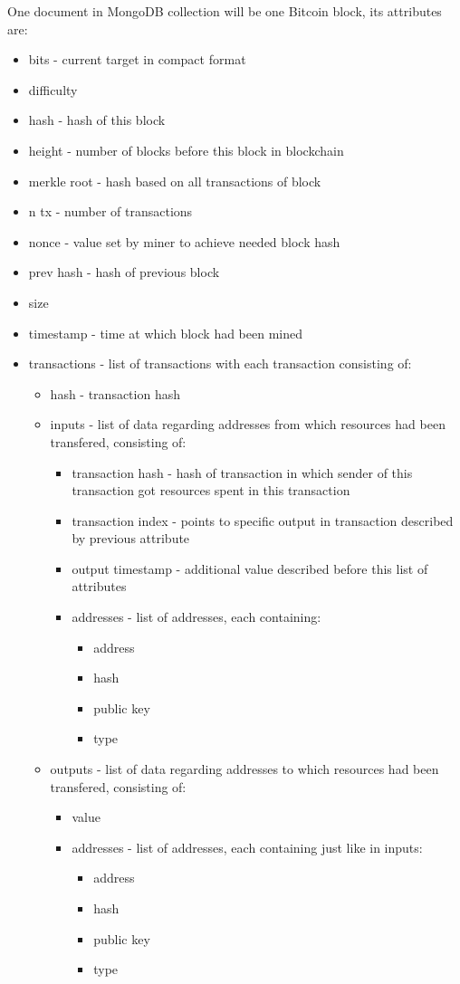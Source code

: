 \documentclass[12pt, en, eng, oneside, final]{mgr}
\begin{document}
One document in MongoDB collection will be one Bitcoin block, its attributes are:
\begin{itemize}
\item
bits - current target in compact format \cite{bitcoin-wiki-bha}
\item
difficulty
\item
hash - hash of this block
\item
height - number of blocks before this block in blockchain
\item
merkle root - hash based on all transactions of block
\item
n tx - number of transactions
\item
nonce - value set by miner to achieve needed block hash
\item
prev hash - hash of previous block
\item
size
\item
timestamp - time at which block had been mined
\item
transactions - list of transactions with each transaction consisting of:
\begin{itemize}
\item
hash - transaction hash
\item
inputs - list of data regarding addresses from which resources had been transfered, consisting of:
\begin{itemize}
\item
transaction hash - hash of transaction in which sender of this transaction got resources spent in this transaction
\item
transaction index - points to specific output in transaction described by previous attribute
\item
output timestamp - additional value described before this list of attributes
\item addresses - list of addresses, each containing:
\begin{itemize}
\item
address
\item
hash
\item
public key
\item
type
\end{itemize}
\end{itemize}	
\item
outputs - list of data regarding addresses to which resources had been transfered, consisting of:	
\begin{itemize}
\item
value
\item addresses - list of addresses, each containing just like in inputs:
\begin{itemize}
\item
address
\item
hash
\item
public key
\item
type
\end{itemize}
\end{itemize} 	
\end{itemize}
\end{itemize}
\end{document}
